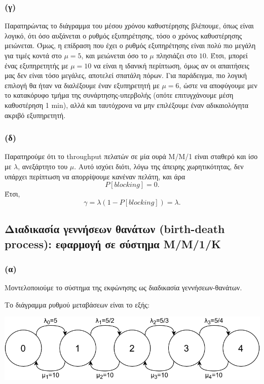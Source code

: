 \documentclass[a4paper]{article}
\begin{document}
\subsubsection*{(γ)}

Παρατηρώντας το διάγραμμα του μέσου χρόνου καθυστέρησης βλέπουμε, όπως είναι λογικό, ότι όσο αυξάνεται ο ρυθμός εξυπηρέτησης, τόσο ο χρόνος καθυστέρησης μειώνεται. Όμως, η επίδραση που έχει ο ρυθμός εξυπηρέτησης είναι πολύ πιο μεγάλη για τιμές κοντά στο $ μ = 5 $, και μειώνεται όσο το $ μ $ πλησιάζει στο $ 10 $. Έτσι, μπορεί ένας εξυπηρετητής με $ μ = 10 $ να είναι η ιδανική περίπτωση, όμως αν οι απαιτήσεις μας δεν είναι τόσο μεγάλες, αποτελεί σπατάλη πόρων. Για παράδειγμα, πιο λογική επιλογή θα ήταν να διαλέξουμε έναν εξυπηρετητή με $ μ = 6 $, ώστε να αποφύγουμε μεν το κατακόρυφο τμήμα της συνάρτησης-υπερβολής (οπότε επιτυγχάνουμε μέση καθυστέρηση 1 min), αλλά και ταυτόχρονα να μην επιλέξουμε έναν αδικαιολόγητα ακριβό εξυπηρετητή.

\subsubsection*{(δ)}

Παρατηρούμε ότι το throughput πελατών σε μία ουρά Μ/Μ/1 είναι σταθερό και ίσο με $λ$, ανεξάρτητο του $μ$. Αυτό ισχύει διότι, λόγω της άπειρης χωρητικότητας, δεν υπάρχει περίπτωση να απορρίψουμε κανέναν πελάτη, και άρα
\[
	P[blocking] = 0.
\] 
Έτσι, 
\[
	γ = λ (1-P[blocking]) = λ.
\]
\subsection*{Διαδικασία γεννήσεων θανάτων (birth-death process): εφαρμογή σε σύστημα Μ/Μ/1/Κ}

\subsubsection*{(α)}

Μοντελοποιούμε το σύστημα της εκφώνησης ως διαδικασία γεννήσεων-θανάτων.

Το διάγραμμα ρυθμού μεταβάσεων είναι το εξής:

\includegraphics[width=\textwidth]{files/3a.pdf}
\end{document}
